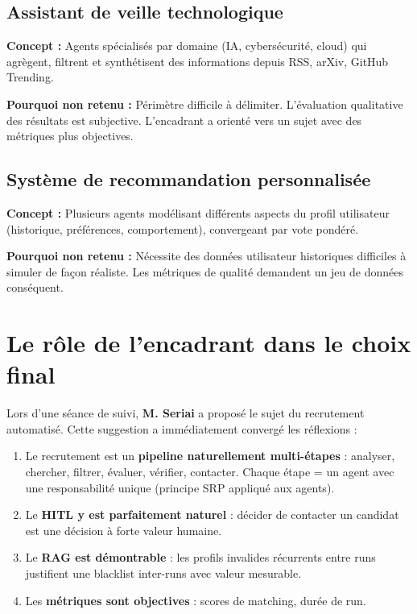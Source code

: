 \documentclass[12pt,a4paper]{report}
\begin{document}
\subsection{Assistant de veille technologique}

\textbf{Concept :} Agents spécialisés par domaine (IA, cybersécurité, cloud) qui
agrègent, filtrent et synthétisent des informations depuis RSS, arXiv, GitHub Trending.

\textbf{Pourquoi non retenu :} Périmètre difficile à délimiter. L'évaluation
qualitative des résultats est subjective. L'encadrant a orienté vers un sujet avec
des métriques plus objectives.

\subsection{Système de recommandation personnalisée}

\textbf{Concept :} Plusieurs agents modélisant différents aspects du profil
utilisateur (historique, préférences, comportement), convergeant par vote pondéré.

\textbf{Pourquoi non retenu :} Nécessite des données utilisateur historiques
difficiles à simuler de façon réaliste. Les métriques de qualité demandent un jeu
de données conséquent.

\section{Le rôle de l'encadrant dans le choix final}

Lors d'une séance de suivi, \textbf{M. Seriai} a proposé le sujet du recrutement
automatisé. Cette suggestion a immédiatement convergé les réflexions :

\begin{enumerate}
  \item Le recrutement est un \textbf{pipeline naturellement multi-étapes} : analyser,
        chercher, filtrer, évaluer, vérifier, contacter. Chaque étape = un agent avec
        une responsabilité unique (principe SRP appliqué aux agents).
  \item Le \textbf{HITL y est parfaitement naturel} : décider de contacter un candidat
        est une décision à forte valeur humaine.
  \item Le \textbf{RAG est démontrable} : les profils invalides récurrents entre runs
        justifient une blacklist inter-runs avec valeur mesurable.
  \item Les \textbf{métriques sont objectives} : scores de matching, durée de run.
\end{enumerate}
\end{document}
